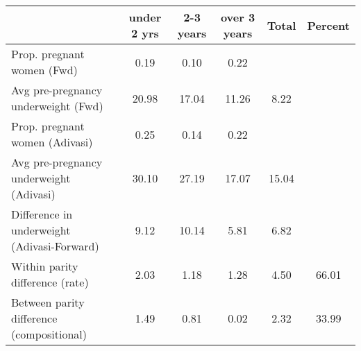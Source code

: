 \begin{tabular}{l*{5}{c}}
\toprule
            &\multicolumn{1}{c}{under 2 yrs}&\multicolumn{1}{c}{2-3 years}&\multicolumn{1}{c}{over 3 years}&\multicolumn{1}{c}{Total}&\multicolumn{1}{c}{Percent}\\
\midrule
\midrule
Prop. pregnant women (Fwd)&        0.19&        0.10&        0.22&            &            \\
Avg pre-pregnancy underweight (Fwd)&       20.98&       17.04&       11.26&        8.22&            \\
Prop. pregnant women (Adivasi)&        0.25&        0.14&        0.22&            &            \\
Avg pre-pregnancy underweight (Adivasi)&       30.10&       27.19&       17.07&       15.04&            \\
Difference in underweight (Adivasi-Forward)&        9.12&       10.14&        5.81&        6.82&            \\
Within parity difference (rate)&        2.03&        1.18&        1.28&        4.50&       66.01\\
Between parity difference (compositional)&        1.49&        0.81&        0.02&        2.32&       33.99\\
\bottomrule
\end{tabular}
